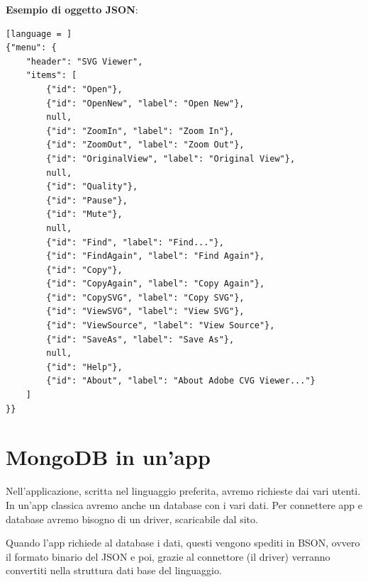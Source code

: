 \documentclass[11pt,a4paper]{book}
\begin{document}
\textbf{Esempio di oggetto JSON}:
\begin{lstlisting}[language = ]
{"menu": {
    "header": "SVG Viewer",
    "items": [
        {"id": "Open"},
        {"id": "OpenNew", "label": "Open New"},
        null,
        {"id": "ZoomIn", "label": "Zoom In"},
        {"id": "ZoomOut", "label": "Zoom Out"},
        {"id": "OriginalView", "label": "Original View"},
        null,
        {"id": "Quality"},
        {"id": "Pause"},
        {"id": "Mute"},
        null,
        {"id": "Find", "label": "Find..."},
        {"id": "FindAgain", "label": "Find Again"},
        {"id": "Copy"},
        {"id": "CopyAgain", "label": "Copy Again"},
        {"id": "CopySVG", "label": "Copy SVG"},
        {"id": "ViewSVG", "label": "View SVG"},
        {"id": "ViewSource", "label": "View Source"},
        {"id": "SaveAs", "label": "Save As"},
        null,
        {"id": "Help"},
        {"id": "About", "label": "About Adobe CVG Viewer..."}
    ]
}}
\end{lstlisting}

\section{MongoDB in un'app}
Nell'applicazione, scritta nel linguaggio preferita, avremo richieste dai vari utenti. In un'app classica avremo anche un database con i vari dati. Per connettere app e database avremo bisogno di un driver, scaricabile dal sito.

Quando l'app richiede al database i dati, questi vengono spediti in BSON, ovvero il formato binario del JSON e poi, grazie al connettore (il driver) verranno convertiti nella struttura dati base del linguaggio.
\end{document}
